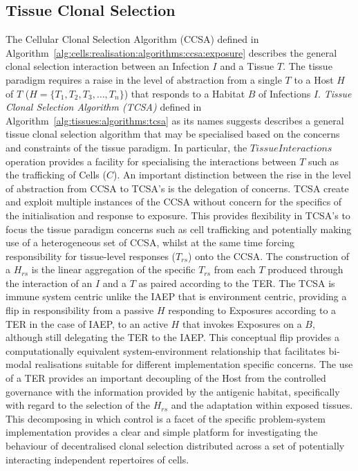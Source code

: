 \subsection{Tissue Clonal Selection}
\label{subsec:tissues:paradigm:method:algorithms}
The Cellular Clonal Selection Algorithm (CCSA) defined in Algorithm~\ref{alg:cells:realisation:algorithms:ccsa:exposure} describes the general clonal selection interaction between an Infection $I$ and a Tissue $T$. The tissue paradigm requires a raise in the level of abstraction from a single $T$ to a Host $H$ of $T$ ($H = \{T_1, T_2, T_3, \ldots, T_n\}$) that responds to a Habitat $B$ of Infections $I$. \emph{Tissue Clonal Selection Algorithm (TCSA)} defined in Algorithm~\ref {alg:tissues:algorithms:tcsa} as its names suggests describes a general tissue clonal selection algorithm that may be specialised based on the concerns and constraints of the tissue paradigm. In particular, the $TissueInteractions$ operation provides a facility for specialising the interactions between $T$ such as the trafficking of Cells ($C$).
An important distinction between the rise in the level of abstraction from CCSA to TCSA's is the delegation of concerns. TCSA create and exploit multiple instances of the CCSA without concern for the specifics of the initialisation and response to exposure. This provides flexibility in TCSA's to focus the tissue paradigm concerns such as cell trafficking and potentially making use of a heterogeneous set of CCSA, whilst at the same time forcing responsibility for tissue-level responses ($T_{rs}$) onto the CCSA. The construction of a $H_{rs}$ is the linear aggregation of the specific $T_{rs}$ from each $T$ produced through the interaction of an $I$ and a $T$ as paired according to the TER.
The TCSA is immune system centric unlike the IAEP that is environment centric, providing a flip in responsibility from a passive $H$ responding to Exposures according to a TER in the case of IAEP, to an active $H$ that invokes Exposures on a $B$, although still delegating the TER to the IAEP. This conceptual flip provides a computationally equivalent system-environment relationship that facilitates bi-modal realisations suitable for different implementation specific concerns.
The use of a TER provides an important decoupling of the Host from the controlled governance with the information provided by the antigenic habitat, specifically with regard to the selection of the $H_{rs}$ and the adaptation within exposed tissues. This decomposing in which control is a facet of the specific problem-system implementation provides a clear and simple platform for investigating the behaviour of decentralised clonal selection distributed across a set of potentially interacting independent repertoires of cells.

